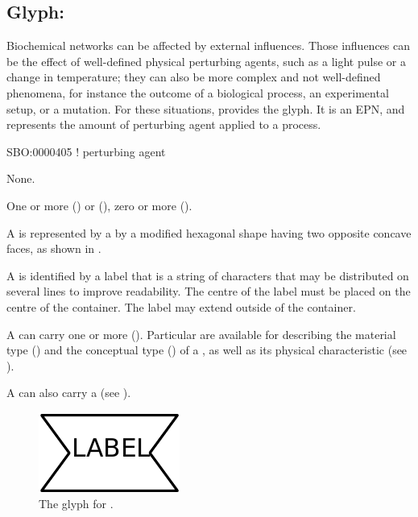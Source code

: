 \subsection{Glyph: }
\label{sec:perturbing agent}

Biochemical networks can be affected by external influences.
Those influences can be the effect of well-defined physical perturbing agents, such as a light pulse or a change in temperature; they can also be more complex and not well-defined phenomena, for instance the outcome of a biological process, an experimental setup, or a mutation.
For these situations, \PD provides the  glyph. It is an EPN, and represents the amount of perturbing agent applied to a process.

\begin{glyphDescription}

\glyphSboTerm
SBO:0000405 ! perturbing agent


\glyphIncoming
None.

\glyphOutgoing
One or more  () or  (), zero or more  ().

\glyphContainer
A  is represented by a by a modified hexagonal shape having two opposite concave faces, as shown in .

\glyphLabel
A  is identified by a label that is  a string of characters that may be distributed on several lines to improve readability.
The centre of the label must be placed on the centre of the container.
The label may extend outside of the container.

\glyphAux
A  can carry one or more  ().
Particular  are available for describing the material type () and the conceptual type () of a , as well as its physical characteristic (see ).

A  can also carry a  (see ).

\end{glyphDescription}

\begin{figure}[H]
  \centering
  \includegraphics{images/build/perturbing_agent.pdf}
  \caption{The \PD glyph for .}
  \label{fig:perturbing_agent}
\end{figure}
